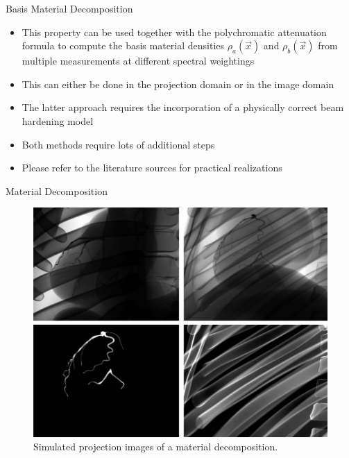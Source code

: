 \begin{frame}[c]{Basis Material Decomposition}
    \begin{itemize}
        \setlength\itemsep{0.3cm}
        \item This property can be used together with the polychromatic attenuation formula to compute the basis material densities $\rho_a(\vec x)$ and  $\rho_b(\vec x)$ from multiple measurements at different spectral weightings
        \item This can either be done in the projection domain or in the image domain
        \item The latter approach requires the incorporation of a physically correct beam hardening model
        \item Both methods require lots of additional steps
        \item Please refer to the literature sources for practical realizations
    \end{itemize}
\end{frame}

\begin{frame}[t]{Material Decomposition}
	\begin{figure}[htpb]
		\centering
		\includegraphics[height=0.75\textheight]{images/lu_material_decomposition.png}
		\caption{Simulated projection images of a material decomposition.}%
	\end{figure}
	\vspace{-0.5cm}
	\flushright{}
	\tiny
\end{frame}


